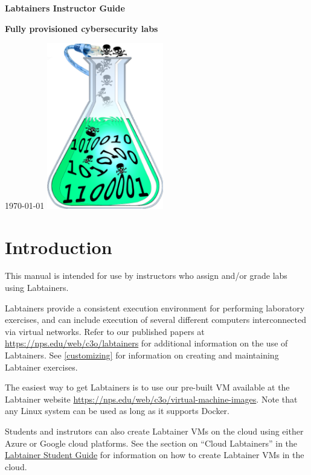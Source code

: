 \documentclass[12pt]{article}
\begin{document}
\begin{titlepage}
\centering
\vfill
\vspace*{4\baselineskip}
{\bfseries\Large
Labtainers Instructor Guide\par
}
\vspace*{4\baselineskip}
{\bfseries
Fully provisioned cybersecurity labs\par
}
\vspace*{2\baselineskip}
\today
\vfill
\includegraphics[width=2in]{labtainer5-sm.png}
\vfill
\end{titlepage}

\section {Introduction}
This manual is intended for use by instructors who assign and/or grade
labs using Labtainers.

Labtainers provide a consistent execution environment for performing
laboratory exercises, and can include execution of several different
computers interconnected via virtual networks.  Refer to our published
papers at \url{https://nps.edu/web/c3o/labtainers} for additional information
on the use of Labtainers.  
See \ref{customizing} for information on creating and maintaining Labtainer exercises.

The easiest way to get Labtainers is to use our pre-built VM available at the Labtainer
website \url{https://nps.edu/web/c3o/virtual-machine-images}.
Note that any Linux system can be used as long as it supports Docker.

Students and instrutors can also create Labtainer VMs on the cloud using either Azure or Google cloud platforms.
See the section on ``Cloud Labtainers'' in the 
\underline{Labtainer Student Guide} for information on how to create Labtainer VMs in the cloud.
\end{document}
